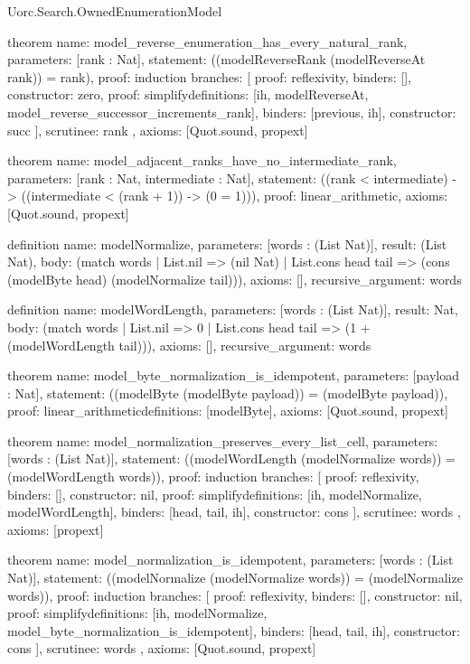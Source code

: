 \begin{lexlean}{Uorc.Search.OwnedEnumerationModel}
\begin{semanticmodule}
theorem{
  name: model_reverse_enumeration_has_every_natural_rank,
  parameters: [rank : Nat],
  statement: ((modelReverseRank (modelReverseAt rank)) = rank),
  proof: induction{
    branches: [
      {proof: reflexivity{}, binders: [], constructor: zero},
      {
        proof: simplify{definitions: [ih, modelReverseAt, model_reverse_successor_increments_rank]},
        binders: [previous, ih],
        constructor: succ
      }
    ],
    scrutinee: rank
  },
  axioms: [Quot.sound, propext]
}

theorem{
  name: model_adjacent_ranks_have_no_intermediate_rank,
  parameters: [rank : Nat, intermediate : Nat],
  statement: ((rank < intermediate) -> ((intermediate < (rank + 1)) -> (0 = 1))),
  proof: linear_arithmetic{},
  axioms: [Quot.sound, propext]
}

definition{
  name: modelNormalize,
  parameters: [words : (List Nat)],
  result: (List Nat),
  body: (match words
    | List.nil => (nil Nat)
    | List.cons head tail => (cons (modelByte head) (modelNormalize tail))),
  axioms: [],
  recursive_argument: words
}

definition{
  name: modelWordLength,
  parameters: [words : (List Nat)],
  result: Nat,
  body: (match words | List.nil => 0 | List.cons head tail => (1 + (modelWordLength tail))),
  axioms: [],
  recursive_argument: words
}

theorem{
  name: model_byte_normalization_is_idempotent,
  parameters: [payload : Nat],
  statement: ((modelByte (modelByte payload)) = (modelByte payload)),
  proof: linear_arithmetic{definitions: [modelByte]},
  axioms: [Quot.sound, propext]
}

theorem{
  name: model_normalization_preserves_every_list_cell,
  parameters: [words : (List Nat)],
  statement: ((modelWordLength (modelNormalize words)) = (modelWordLength words)),
  proof: induction{
    branches: [
      {proof: reflexivity{}, binders: [], constructor: nil},
      {
        proof: simplify{definitions: [ih, modelNormalize, modelWordLength]},
        binders: [head, tail, ih],
        constructor: cons
      }
    ],
    scrutinee: words
  },
  axioms: [propext]
}

theorem{
  name: model_normalization_is_idempotent,
  parameters: [words : (List Nat)],
  statement: ((modelNormalize (modelNormalize words)) = (modelNormalize words)),
  proof: induction{
    branches: [
      {proof: reflexivity{}, binders: [], constructor: nil},
      {
        proof: simplify{definitions: [ih, modelNormalize, model_byte_normalization_is_idempotent]},
        binders: [head, tail, ih],
        constructor: cons
      }
    ],
    scrutinee: words
  },
  axioms: [Quot.sound, propext]
}


\end{semanticmodule}
\end{lexlean}

